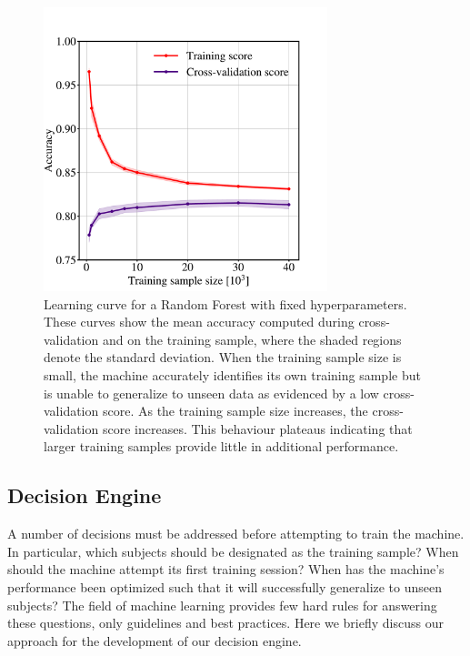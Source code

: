\begin{figure}[t!]
\centering
\includegraphics[width=3.25in]{Figures/human_machine/f9.pdf}
\caption[Random Forest learning curve]{Learning curve for a Random Forest with fixed hyperparameters. These curves show the mean accuracy computed during cross-validation and on the training sample, where the shaded regions denote the standard deviation. When the training sample size is small, the machine accurately identifies its own training sample but is unable to generalize to unseen data as evidenced by a low cross-validation score. As the training sample size increases, the cross-validation score increases. This behaviour plateaus indicating that larger training samples provide little in additional performance. \label{fig: learning curve}}
\end{figure}


\subsection{Decision Engine}\label{chap4: decision engine}
A number of decisions must be addressed before attempting to train the machine. 
In particular, which subjects should be designated as the training sample? 
When should the machine attempt its first training session? 
When has the machine's performance been optimized such that it will successfully
generalize to unseen subjects? The field of machine learning provides few hard rules 
for answering these questions, only guidelines and best practices. 
Here we briefly discuss our approach for the development of our decision engine.



